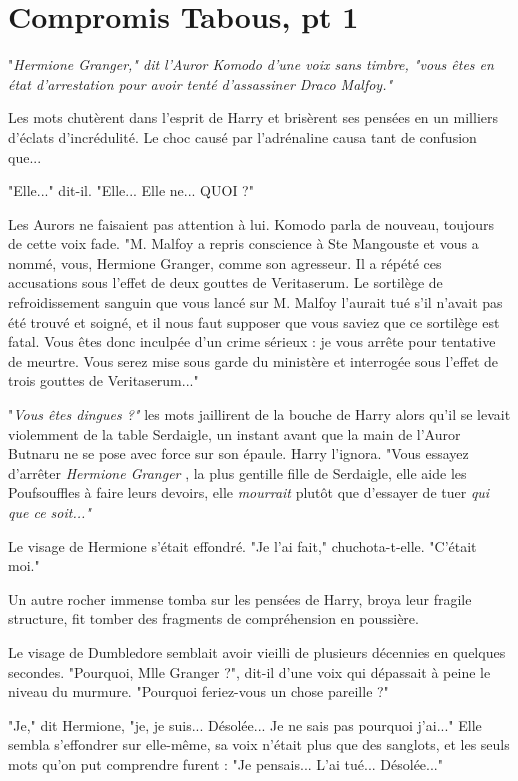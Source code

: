 
\chapter{Compromis Tabous, pt 1}

"\emph{Hermione Granger," dit l'Auror Komodo d'une voix sans timbre, "vous êtes en état d'arrestation pour avoir tenté d'assassiner Draco Malfoy."} 

Les mots chutèrent dans l'esprit de Harry et brisèrent ses pensées en un milliers d'éclats d'incrédulité. Le choc causé par l'adrénaline causa tant de confusion que...

"Elle..." dit-il. "Elle... Elle ne... QUOI ?"

Les Aurors ne faisaient pas attention à lui. Komodo parla de nouveau, toujours de cette voix fade. "M. Malfoy a repris conscience à Ste Mangouste et vous a nommé, vous, Hermione Granger, comme son agresseur. Il a répété ces accusations sous l'effet de deux gouttes de Veritaserum. Le sortilège de refroidissement sanguin que vous lancé sur M. Malfoy l'aurait tué s'il n'avait pas été trouvé et soigné, et il nous faut supposer que vous saviez que ce sortilège est fatal. Vous êtes donc inculpée d'un crime sérieux : je vous arrête pour tentative de meurtre. Vous serez mise sous garde du ministère et interrogée sous l'effet de trois gouttes de Veritaserum..."

"\emph{Vous êtes dingues ?"}  les mots jaillirent de la bouche de Harry alors qu'il se levait violemment de la table Serdaigle, un instant avant que la main de l'Auror Butnaru ne se pose avec force sur son épaule. Harry l'ignora. "Vous essayez d'arrêter \emph{Hermione Granger} , la plus gentille fille de Serdaigle, elle aide les Poufsouffles à faire leurs devoirs, elle \emph{mourrait}  plutôt que d'essayer de tuer \emph{qui que ce soit..."} 

Le visage de Hermione s'était effondré. "Je l'ai fait," chuchota-t-elle. "C'était moi."

Un autre rocher immense tomba sur les pensées de Harry, broya leur fragile structure, fit tomber des fragments de compréhension en poussière.

Le visage de Dumbledore semblait avoir vieilli de plusieurs décennies en quelques secondes. "Pourquoi, Mlle Granger ?", dit-il d'une voix qui dépassait à peine le niveau du murmure. "Pourquoi feriez-vous un chose pareille ?"

"Je," dit Hermione, "je, je suis... Désolée... Je ne sais pas pourquoi j'ai..." Elle sembla s'effondrer sur elle-même, sa voix n'était plus que des sanglots, et les seuls mots qu'on put comprendre furent : "Je pensais... L'ai tué... Désolée..."

